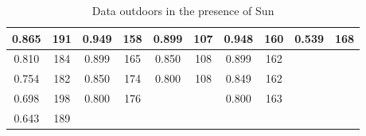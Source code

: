 \begin{table}[H]
\begin{tabular}{|cc|cc|cc|cc|cc|}
		\multicolumn{1}{|c|}{0.865}          & 191                                & \multicolumn{1}{c|}{0.949}          & 158                               & \multicolumn{1}{c|}{0.899}           & 107                   & \multicolumn{1}{c|}{0.948}      & 160                   & \multicolumn{1}{c|}{0.539}      & 168                   \\ \hline
		\multicolumn{1}{|c|}{0.810}          & 184                                & \multicolumn{1}{c|}{0.899}          & 165                               & \multicolumn{1}{c|}{0.850}           & 108                   & \multicolumn{1}{c|}{0.899}      & 162                   & \multicolumn{1}{c|}{}           &                       \\ \hline
		\multicolumn{1}{|c|}{0.754}          & 182                                & \multicolumn{1}{c|}{0.850}          & 174                               & \multicolumn{1}{c|}{0.800}           & 108                   & \multicolumn{1}{c|}{0.849}      & 162                   & \multicolumn{1}{c|}{}           &                       \\ \hline
		\multicolumn{1}{|c|}{0.698}          & 198                                & \multicolumn{1}{c|}{0.800}          & 176                               & \multicolumn{1}{c|}{}                &                       & \multicolumn{1}{c|}{0.800}      & 163                   & \multicolumn{1}{c|}{}           &                       \\ \hline
		\multicolumn{1}{|c|}{0.643}          & 189                                & \multicolumn{1}{c|}{}               &                                   & \multicolumn{1}{c|}{}                &                       & \multicolumn{1}{c|}{}           &                       & \multicolumn{1}{c|}{}           &                       \\ \hline
	\end{tabular}
	\caption{Data outdoors in the presence of Sun}
	\label{tab:outdoor}
\end{table}